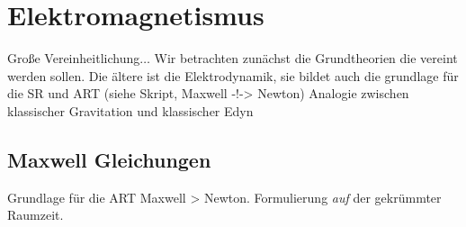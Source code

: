 \chapter{Elektromagnetismus}
Große Vereinheitlichung$\ldots$
Wir betrachten zunächst die Grundtheorien die vereint werden sollen. 
Die ältere ist die Elektrodynamik, sie bildet auch die grundlage für die SR und
ART (siehe Skript, Maxwell -!-> Newton) Analogie zwischen klassischer Gravitation und
klassischer Edyn
\section{Maxwell Gleichungen}
Grundlage für die ART Maxwell > Newton.
Formulierung \emph{auf} der gekrümmter Raumzeit.